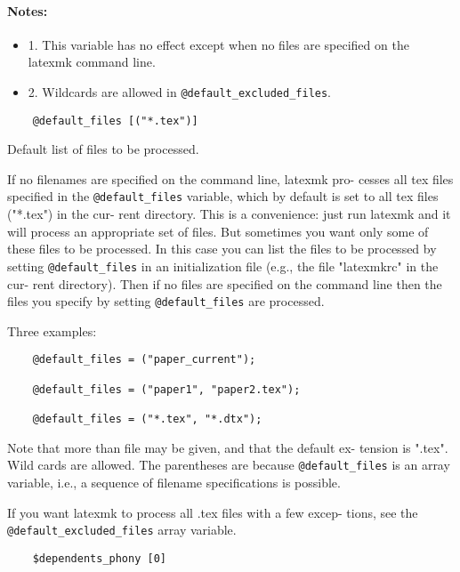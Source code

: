 \paragraph{Notes:}

\begin{itemize}
	
\item 1.  This variable has no effect except when no files are
specified on the latexmk command line.  

\item 2. Wildcards are allowed
in \verb|@default_excluded_files|.
\end{itemize}

\begin{verbatim}
	@default_files [("*.tex")]
\end{verbatim}

Default list of files to be processed.

If  no filenames are specified on the command line, latexmk pro-
cesses all tex files specified in the  \verb|@default_files|  variable,
which  by  default is set to all tex files ("*.tex") in the cur-
rent directory.  This is a convenience: just run latexmk and  it
will  process  an  appropriate  set of files.  But sometimes you
want only some of these files to be processed.  In this case you
can  list the files to be processed by setting \verb|@default_files| in
an initialization file (e.g., the file "latexmkrc" in  the  cur-
rent  directory).  Then if no files are specified on the command
line then the files you specify by  setting  \verb|@default_files|  are
processed.

Three examples:

\begin{verbatim}
	@default_files = ("paper_current");
	
	@default_files = ("paper1", "paper2.tex");
	
	@default_files = ("*.tex", "*.dtx");
\end{verbatim}

Note  that more than file may be given, and that the default ex-
tension is ".tex".  Wild cards are allowed.  The parentheses are
because \verb|@default_files| is an array variable, i.e., a sequence of
filename specifications is possible.

If you want latexmk to process all .tex files with a few  excep-
tions, see the \verb|@default_excluded_files| array variable.

\begin{verbatim}
	$dependents_phony [0]
\end{verbatim}

